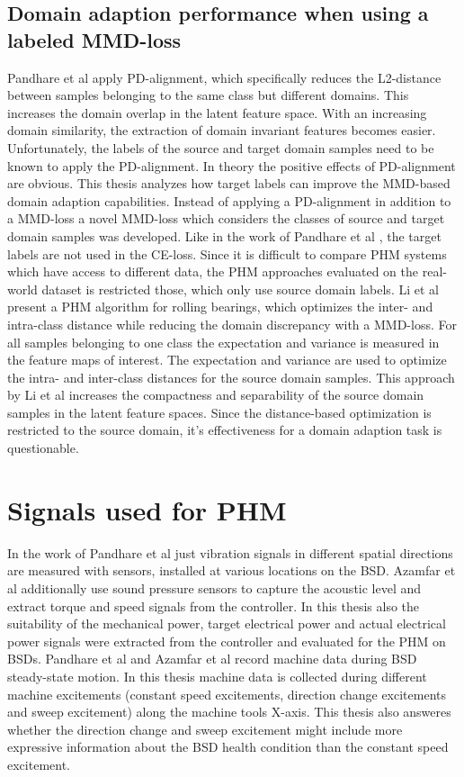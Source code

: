\subsection{Domain adaption performance when using a labeled MMD-loss}
Pandhare et al \cite{Pandhare2021} apply PD-alignment, which specifically reduces the L2-distance between samples belonging to the same class but different domains. This increases the domain overlap in the latent feature space. With an increasing domain similarity, the extraction of domain invariant features becomes easier. Unfortunately, the labels of the source and target domain samples need to be known to apply the PD-alignment. In theory the positive effects of PD-alignment are obvious. This thesis analyzes how target labels can improve the MMD-based domain adaption capabilities. Instead of applying a PD-alignment in addition to a MMD-loss a novel MMD-loss which considers the classes of source and target domain samples was developed. Like in the work of Pandhare et al \cite{Pandhare2021}, the target labels are not used in the CE-loss. Since it is difficult to compare PHM systems which have access to different data, the PHM approaches evaluated on the real-world dataset is restricted those, which only use source domain labels. Li et al \cite{Li2018} present a PHM algorithm for rolling bearings, which optimizes the inter- and intra-class distance while reducing the domain discrepancy with a MMD-loss. For all samples belonging to one class the expectation and variance is measured in the feature maps of interest. The expectation and variance are used to optimize the intra- and inter-class distances for the source domain samples. This approach by Li et al increases the compactness and separability of the source domain samples in the latent feature spaces. Since the distance-based optimization is restricted to the source domain, it's effectiveness for a domain adaption task is questionable.

\section{Signals used for PHM}
In the work of Pandhare et al \cite{Pandhare2021} just vibration signals in different spatial directions are measured with sensors, installed at various locations on the BSD. Azamfar et al \cite{AZAMFAR2020103932} additionally use sound pressure sensors to capture the acoustic level and extract torque and speed signals from the controller. In this thesis also the suitability of the mechanical power, target electrical power and actual electrical power signals were extracted from the controller and evaluated for the PHM on BSDs. Pandhare et al and Azamfar et al record machine data during BSD steady-state motion. In this thesis machine data is collected during different machine excitements (constant speed excitements, direction change excitements and sweep excitement) along the machine tools X-axis. This thesis also answeres whether the direction change and sweep excitement might include more expressive information about the BSD health condition than the constant speed excitement.


